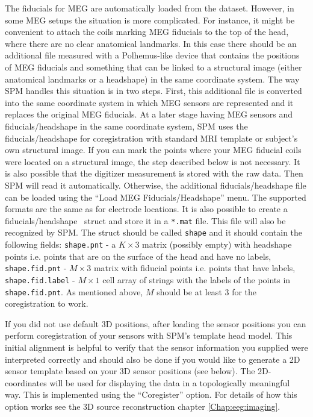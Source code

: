 The fiducials for MEG are automatically loaded from the dataset. However, in some MEG setups the situation is more complicated. For instance, it might be convenient to attach the coils marking MEG fiducials to the top of the head, where there are no clear anatomical landmarks. In this case there should be an additional file measured with a Polhemus-like device that contains the positions of MEG fiducials and something that can be linked to a structural image (either anatomical landmarks or a headshape) in the same coordinate system. The way SPM handles this situation is in two steps. First, this additional file is converted into the same coordinate system in which MEG sensors are represented and it replaces the original MEG fiducials. At a later stage having MEG sensors and fiducials/headshape in the same coordinate system, SPM uses the fiducials/headshape for coregistration with standard MRI template or subject's own structural image. If you can mark the points where your MEG fiducial coils were located on a structural image, the step described below is not necessary. It is also possible that the digitizer measurement is stored with the raw data. Then SPM will read it automatically. Otherwise, the additional fiducials/headshape file can be loaded using the ``Load MEG Fiducials/Headshape'' menu. The supported formats are the same as for electrode locations. It is also possible to create a fiducials/headshape \matlab\ struct and store it in a \texttt{*.mat} file. This file will also be recognized by SPM. The struct should be called \texttt{shape} and it should contain the following fields: \texttt{shape.pnt} - a $K \times 3$ matrix (possibly empty) with headshape points i.e. points that are on the surface of the head and have no labels, \texttt{shape.fid.pnt} - $M \times 3$ matrix with fiducial points i.e. points that have labels, \texttt{shape.fid.label} - $M \times 1$ cell array of strings with the labels of the points in \texttt{shape.fid.pnt}. As mentioned above, $M$ should be at least 3 for the coregistration to work.

If you did not use default 3D positions, after loading the sensor positions you can perform coregistration of your sensors with SPM's template head model. This initial alignment is helpful to verify that the sensor information you supplied were interpreted correctly and should also be done if you would like to generate a 2D sensor template based on your 3D sensor positions (see below). The 2D-coordinates will be used for displaying the data in a topologically meaningful way. This is implemented using the ``Coregister'' option. For details of how this option works see the 3D source reconstruction chapter \ref{Chap:eeg:imaging}.

